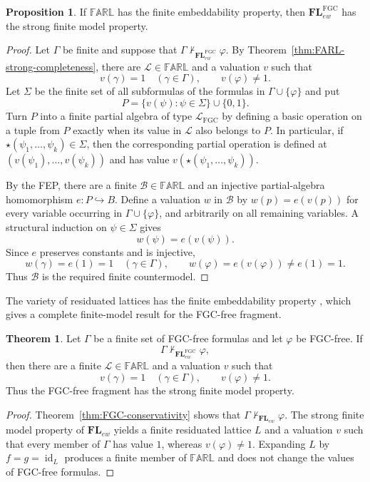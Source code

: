 \documentclass[final,12pt,times]{elsarticle}
\theoremstyle{plain}
\theoremstyle{definition}
\newtheorem{theorem}[definition]{Theorem}
\newtheorem{proposition}[definition]{Proposition}
\theoremstyle{break}
\newcommand{\FARL}{\mathbb{FARL}}
\begin{document}
\begin{proposition}
\label{prop:FEP-implies-SFMP}
If $\FARL$ has the finite embeddability property, then
$\mathbf{FL}^{\mathrm{FGC}}_{ew}$ has the strong finite model property.
\end{proposition}

\begin{proof}
Let $\Gamma$ be finite and suppose that
$\Gamma\nvdash_{\mathbf{FL}^{\mathrm{FGC}}_{ew}}\varphi$.  By
Theorem~\ref{thm:FARL-strong-completeness}, there are
$\mathscr{L}\in\FARL$ and a valuation $v$ such that
\[
 v(\gamma)=1\quad(\gamma\in\Gamma),
 \qquad
 v(\varphi)\ne1.
\]
Let $\Sigma$ be the finite set of all subformulas of the formulas in
$\Gamma\cup\{\varphi\}$ and put
\[
 P=\{v(\psi):\psi\in\Sigma\}\cup\{0,1\}.
\]
Turn $P$ into a finite partial algebra of type
$\mathcal L_{\mathrm{FGC}}$ by defining a basic operation on a tuple from $P$
exactly when its value in $\mathscr{L}$ also belongs to $P$.  In particular, if
$\star(\psi_1,\ldots,\psi_k)\in\Sigma$, then the corresponding partial
operation is defined at
$(v(\psi_1),\ldots,v(\psi_k))$ and has value
$v(\star(\psi_1,\ldots,\psi_k))$.

By the FEP, there are a finite $\mathscr{B}\in\FARL$ and an injective
partial-algebra homomorphism $e:P\hookrightarrow B$.  Define a valuation $w$
in $\mathscr{B}$ by $w(p)=e(v(p))$ for every variable occurring in
$\Gamma\cup\{\varphi\}$, and arbitrarily on all remaining variables.  A
structural induction on $\psi\in\Sigma$ gives
\[
 w(\psi)=e(v(\psi)).
\]
Since $e$ preserves constants and is injective,
\[
 w(\gamma)=e(1)=1\quad(\gamma\in\Gamma),
 \qquad
 w(\varphi)=e(v(\varphi))\ne e(1)=1.
\]
Thus $\mathscr{B}$ is the required finite countermodel.
\end{proof}

The variety of residuated lattices has the finite embeddability property \cite{Galatos}, which gives a complete finite-model result for the
FGC-free fragment.

\begin{theorem}
\label{thm:FGC-free-SFMP}
Let $\Gamma$ be a finite set of FGC-free formulas and let $\varphi$ be
FGC-free.  If
\[
 \Gamma\nvdash_{\mathbf{FL}^{\mathrm{FGC}}_{ew}}\varphi,
\]
then there are a finite $\mathscr{L}\in\FARL$ and a valuation $v$ such
that
\[
 v(\gamma)=1\quad(\gamma\in\Gamma),
 \qquad
 v(\varphi)\ne1.
\]
Thus the FGC-free fragment has the strong finite model property.
\end{theorem}

\begin{proof}
Theorem~\ref{thm:FGC-conservativity} shows that
$\Gamma\nvdash_{\mathbf{FL}_{ew}}\varphi$.  The strong finite model property of
$\mathbf{FL}_{ew}$ yields a finite residuated lattice $L$ and a
valuation $v$ such that every member of $\Gamma$ has value $1$, whereas
$v(\varphi)\ne1$.  Expanding $L$ by
$f=g=\operatorname{id}_L$ produces a finite member of $\FARL$ and does
not change the values of FGC-free formulas.
\end{proof}
\end{document}
